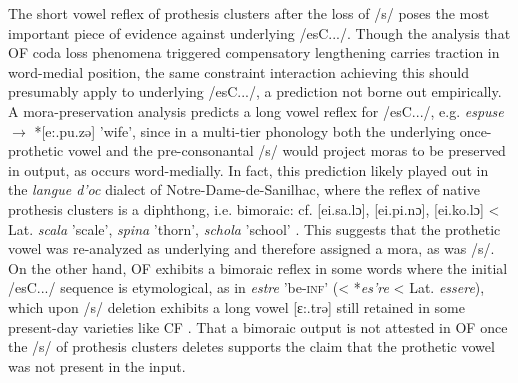 \documentclass[output=paper,colorlinks,citecolor=brown,
]{langscibook}
\begin{document}
The short vowel reflex of prothesis clusters after the loss of /s/ poses the most important piece of evidence against underlying /esC.../.  Though the analysis that OF coda loss phenomena triggered compensatory lengthening \citep{Gess1998, Gess1999} carries traction in word-medial position, the same constraint interaction achieving this should presumably apply to underlying /esC.../, a prediction not borne out empirically.  A mora-preservation analysis predicts a long vowel reflex for /esC.../, e.g. \textit{espuse} $\rightarrow$ *[e:.pu.zə] 'wife', since in a multi-tier phonology both the underlying once-prothetic vowel and the pre-consonantal /s/ would project moras to be preserved in output, as occurs word-medially.  In fact, this prediction likely played out in the \textit{langue d'oc} dialect of Notre-Dame-de-Sanilhac, where the reflex of native prothesis clusters is a diphthong, i.e. bimoraic: cf. [ei.sa.lɔ], [ei.pi.nɔ], [ei.ko.lɔ] < Lat. \textit{scala} 'scale', \textit{spina} 'thorn', \textit{schola} 'school' \citep[135]{Sampson2010}.  This suggests that the prothetic vowel was re-analyzed as underlying and therefore assigned a mora, as was /s/.  On the other hand, OF exhibits a bimoraic reflex in some words where the initial /esC.../ sequence is etymological, as in \textit{estre} 'be-\textsc{inf}' (< *\textit{es're} < Lat. \textit{essere}), which upon /s/ deletion exhibits a long vowel [ɛ:.trə] still retained in some present-day varieties like CF \citep{Walker1984}.  That a bimoraic output is not attested in OF once the /s/ of prothesis clusters deletes supports the claim that the prothetic vowel was not present in the input.
\end{document}
